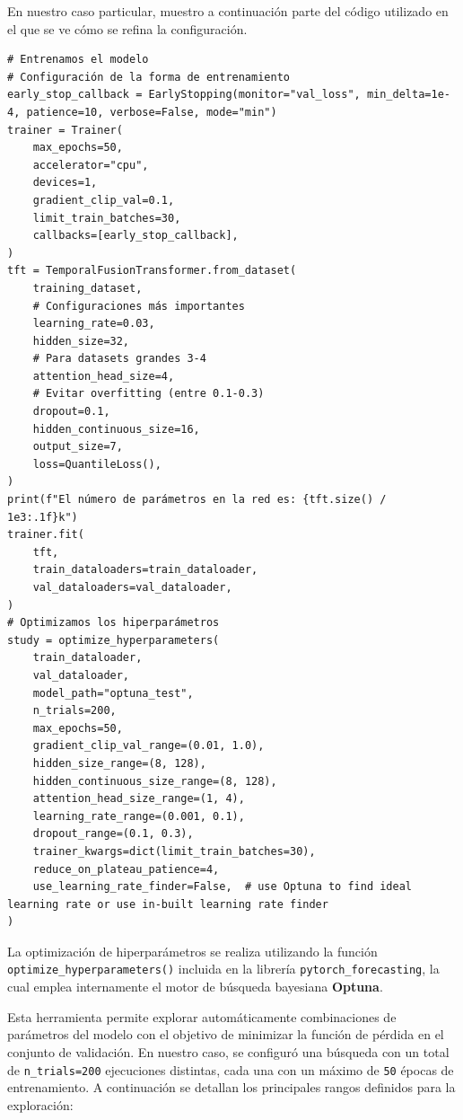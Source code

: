 En nuestro caso particular, muestro a continuación parte del código utilizado en el que se ve cómo se refina la configuración.
\begin{lstlisting}[caption={Código de implementación del modelo TFT}, label = {TFT_model_implementacion}]
# Entrenamos el modelo
# Configuración de la forma de entrenamiento
early_stop_callback = EarlyStopping(monitor="val_loss", min_delta=1e-4, patience=10, verbose=False, mode="min")
trainer = Trainer(
    max_epochs=50,
    accelerator="cpu",
    devices=1,
    gradient_clip_val=0.1,
    limit_train_batches=30,
    callbacks=[early_stop_callback],
)
tft = TemporalFusionTransformer.from_dataset(
    training_dataset,
    # Configuraciones más importantes
    learning_rate=0.03,
    hidden_size=32,
    # Para datasets grandes 3-4
    attention_head_size=4,
    # Evitar overfitting (entre 0.1-0.3)
    dropout=0.1,
    hidden_continuous_size=16,
    output_size=7,
    loss=QuantileLoss(),
)
print(f"El número de parámetros en la red es: {tft.size() / 1e3:.1f}k")
trainer.fit(
    tft,
    train_dataloaders=train_dataloader,
    val_dataloaders=val_dataloader,
)
# Optimizamos los hiperparámetros
study = optimize_hyperparameters(
    train_dataloader,
    val_dataloader,
    model_path="optuna_test",
    n_trials=200,
    max_epochs=50,
    gradient_clip_val_range=(0.01, 1.0),
    hidden_size_range=(8, 128),
    hidden_continuous_size_range=(8, 128),
    attention_head_size_range=(1, 4),
    learning_rate_range=(0.001, 0.1),
    dropout_range=(0.1, 0.3),
    trainer_kwargs=dict(limit_train_batches=30),
    reduce_on_plateau_patience=4,
    use_learning_rate_finder=False,  # use Optuna to find ideal learning rate or use in-built learning rate finder
)
\end{lstlisting} 

La optimización de hiperparámetros se realiza utilizando la función \texttt{optimize\_hyperparameters()} incluida en la librería \texttt{pytorch\_forecasting}, la cual emplea internamente el motor de búsqueda bayesiana \textbf{Optuna}.

Esta herramienta permite explorar automáticamente combinaciones de parámetros del modelo con el objetivo de minimizar la función de pérdida en el conjunto de validación. En nuestro caso, se configuró una búsqueda con un total de \texttt{n\_trials=200} ejecuciones distintas, cada una con un máximo de \texttt{50} épocas de entrenamiento. A continuación se detallan los principales rangos definidos para la exploración:

